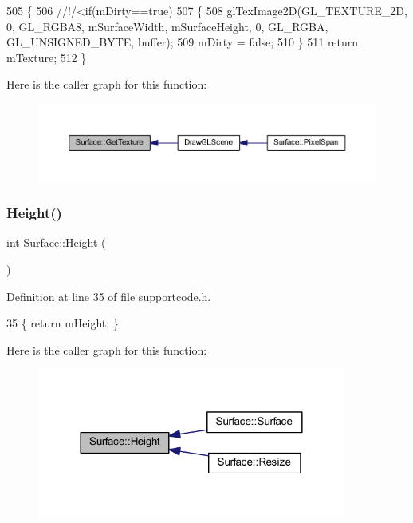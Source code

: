 \begin{DoxyCode}
505 \{\textcolor{comment}{}
506 \textcolor{comment}{    //!/<if(mDirty==true)}
507 \textcolor{comment}{}    \{
508         glTexImage2D(GL\_TEXTURE\_2D, 0, GL\_RGBA8, mSurfaceWidth, mSurfaceHeight, 0, GL\_RGBA, 
      GL\_UNSIGNED\_BYTE, buffer);
509         mDirty = \textcolor{keyword}{false};
510     \}
511     \textcolor{keywordflow}{return} mTexture; 
512 \}
\end{DoxyCode}
Here is the caller graph for this function\+:
\nopagebreak
\begin{figure}[H]
\begin{center}
\leavevmode
\includegraphics[width=350pt]{class_surface_a2cd8789d26457187b8af4be8c178e9d4_icgraph}
\end{center}
\end{figure}
\mbox{\label{class_surface_ab901f48d51b3fd427415b580dc15518c}} 
\subsubsection{\texorpdfstring{Height()}{Height()}}
{\footnotesize\ttfamily int Surface\+::\+Height (\begin{DoxyParamCaption}{ }\end{DoxyParamCaption})\hspace{0.3cm}{\ttfamily [inline]}}



Definition at line 35 of file supportcode.\+h.


\begin{DoxyCode}
35 \{ \textcolor{keywordflow}{return} mHeight; \}
\end{DoxyCode}
Here is the caller graph for this function\+:
\nopagebreak
\begin{figure}[H]
\begin{center}
\leavevmode
\includegraphics[width=288pt]{class_surface_ab901f48d51b3fd427415b580dc15518c_icgraph}
\end{center}
\end{figure}
\mbox{\label{class_surface_abe0d542404575c60911d6ad4219560f9}} 
